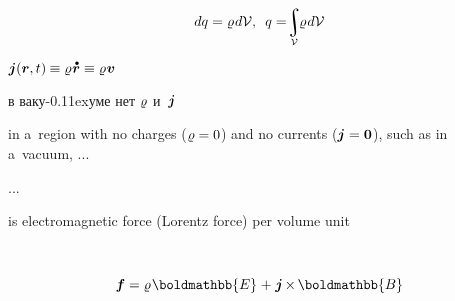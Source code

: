 \nopagebreak\vspace{-0.2em}\begin{equation*}
dq = \chargedensity \hspace{.15ex} d \mathcal{V}
, \hspace{.5em}
q = \hspace{-0.5ex} \scalebox{0.9}{$\displaystyle\integral\displaylimits_{\mathcal{V}}$} \hspace{-0.3ex} \chargedensity \hspace{.15ex} d\mathcal{V}
\end{equation*}

  
${\currentdensity(\bm{r}, t) \hspace{-0.1ex} \equiv \chargedensity \hspace{.1ex} \mathdotabove{\bm{r}} \equiv \chargedensity \hspace{.1ex} \bm{v}}$

\foreignlanguage{russian}{в ваку\kern-0.11exуме нет $\varrho$ и~$\bm{j}$}

in a~region with no charges (${\varrho = 0}$) and no currents (${\bm{j} = \bm{0}}$), such as in a~vacuum, ...

...

 is electromagnetic force (Lorentz force) per volume unit

   ~   \ru{)} 

\nopagebreak\vspace{-0.2em}\en{\vspace{-0.7em}}\begin{equation}\label{ponderomotive.electromagneticforcepervolumeunit}
\bm{f} = \chargedensity \hspace{.16ex} \boldmathbb{E} \hspace{.1ex} + \hspace{.1ex} \currentdensity \hspace{-0.16ex} \times \hspace{-0.2ex} \boldmathbb{B}
\end{equation}

